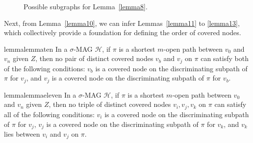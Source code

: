 \documentclass[accepted]{uai2025} %
\begin{document}
\begin{figure}[t]
        \medskip

        \medskip
  \caption{Possible subgraphs for Lemma~\ref{lemma8}.}
  \label{fig:lemma8}
\end{figure}

Next, from Lemma~\ref{lemma10}, we can infer Lemmas~\ref{lemma11} to \ref{lemma13}, which collectively provide a foundation for defining the order of covered nodes.

\begin{restatable}{lemma}{lemmaten} \label{lemma10}
In a \( \sigma \)-MAG $\mathcal{H}$, if \( \pi \) is a shortest $m$-open path between \( v_0 \) and \( v_n \) given \( Z \), then no pair of distinct covered nodes \( v_b \) and \( v_j \) on $\pi$ can satisfy both of the following conditions: \( v_b \) is a covered node on the discriminating subpath of \( \pi \) for \( v_j \), and \( v_j \) is a covered node on the discriminating subpath of \( \pi \) for \( v_b \).  
\end{restatable}

\begin{restatable}{lemma}{lemmaeleven} \label{lemma11}
In a $\sigma$-MAG $\mathcal{H}$, if $\pi$ is a shortest $m$-open path between $v_0$ and $v_n$ given $Z$, then no triple of distinct covered nodes $v_i,v_j,v_k$ on $\pi$ can satisfy all of the following conditions: $v_i$ is a covered node on the discriminating subpath of $\pi$ for $v_j$, $v_j$ is a covered node on the discriminating subpath of $\pi$ for $v_k$, and $v_k$ lies between $v_i$ and $v_j$ on $\pi$.
\end{restatable}
\end{document}
